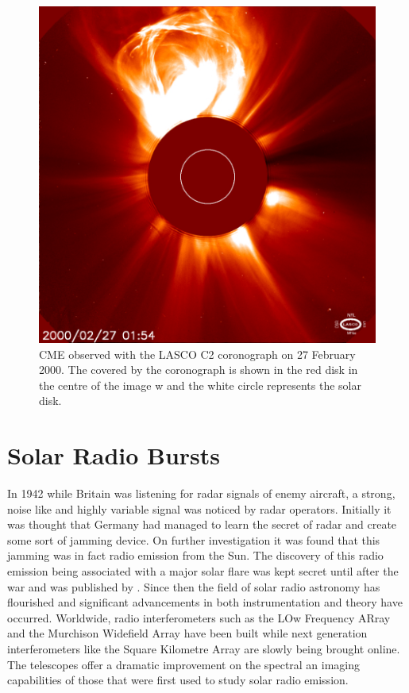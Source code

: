 \begin{figure}[ht]
    \centering
    \includegraphics[width=0.75\columnwidth]{Images/LASCO_C2_CME.jpg}
    \caption[CME observed with the LASCO C2 coronograph on 27 February 2000.]{CME observed with the LASCO C2 coronograph on 27 February 2000. The covered by the coronograph is shown in the red disk in the centre of the image w and the white circle represents the solar disk.}
    \label{fig:CME}
\end{figure}

\section{Solar Radio Bursts}
In 1942 while Britain was listening for radar signals of enemy aircraft, a strong, noise like and highly variable signal was noticed by radar operators. Initially it was thought that Germany had managed to learn the secret of radar and create some sort of jamming device. On further investigation it was found that this jamming was in fact radio emission from the Sun. The discovery of this radio emission being associated with a major solar flare was kept secret until after the war and was published by \cite{Appleton1946}.
Since then the field of solar radio astronomy has flourished and significant advancements in both instrumentation and theory have occurred. Worldwide, radio interferometers such as the LOw Frequency ARray \cite[LOFAR;][]{VanHaarlem2013} and the Murchison Widefield Array \citep[MWA;][]{Lonsdale2009} have been built while next generation interferometers like the Square Kilometre Array \citep[SKA;][]{McMullin2020} are slowly being brought online. The telescopes offer a dramatic improvement on the spectral an imaging capabilities of those that were first used to study solar radio emission.

